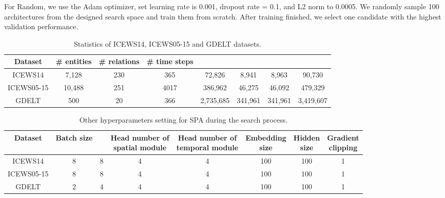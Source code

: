 \documentclass[11pt]{article}
\begin{document}
For Random, 
we use the Adam optimizer, 
set learning rate is 0.001, 
dropout rate = 0.1, and L2 norm to 0.0005.
We randomly sample 100 architectures from the designed search space and train them from scratch.   
After training finished, 
we select one candidate with the highest validation performance.

\begin{table*}[!h]
	\centering
	\begin{tabular}{cccccccc}
		\toprule
		\textbf{Dataset} &\textbf{\# entities} & \textbf{\# relations} &\textbf{\# time steps} &\multicolumn{1}{c}{\bm{$N_{train}$}}   & \multicolumn{1}{c}{\bm{$N_{valid}$}} & \multicolumn{1}{c}{\bm{$N_{test}$}} & \multicolumn{1}{c}{\bm{$N_{total}$}}\\
		\midrule
		ICEWS14 & 7,128 &230 &365 &72,826 &8,941 &8,963 &90,730 \\
		ICEWS05-15 & 10,488 & 251 & 4017 & 386,962 & 46,275 & 46,092 & 479,329 \\
		GDELT & 500 & 20 & 366 & 2,735,685 & 341,961 & 341,961 &3,419,607 \\
		\bottomrule
	\end{tabular}
	\caption{Statistics of ICEWS14, ICEWS05-15 and GDELT datasets. }
	\label{tab-dataset}
\end{table*}

\begin{table*}[!h]
	\centering 
	\setlength\tabcolsep{2pt}
	\begin{tabular}{cccccccc}
		\toprule
		\textbf{Dataset} & \textbf{Batch size} & \bm{$\tau$} & \makecell{\textbf{Head number of} \\\textbf{spatial module}} & \makecell{\textbf{Head number of} \\\textbf{temporal module}} &\makecell{\textbf{Embedding} \\ \textbf{size}} & \makecell{\textbf{Hidden} \\ \textbf{size}}  & \makecell{\textbf{Gradient}\\ \textbf{clipping}} \\
		\midrule
		ICEWS14 & 8 & 8 & 4 & 4 & 100 & 100 & 1\\
		\midrule
		ICEWS05-15 & 8 & 8 & 4 & 4 & 100 & 100 & 1\\
		\midrule
		GDELT & 2 & 4 & 4 & 4 & 100 & 100 & 1\\
		\bottomrule
	\end{tabular}
	\caption{Other hyperparameters setting for SPA during the search process.}
	\label{hyperparameters}
\end{table*}
\end{document}
